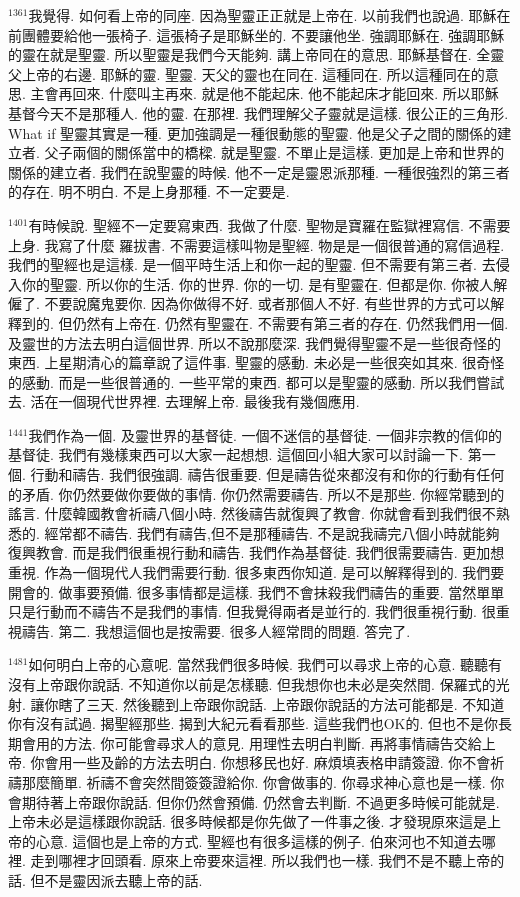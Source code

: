 \documentclass{book}
\begin{document}
$^{1361}$我覺得.
如何看上帝的同座.
因為聖靈正正就是上帝在.
以前我們也說過.
耶穌在前團體要給他一張椅子.
這張椅子是耶穌坐的.
不要讓他坐.
強調耶穌在.
強調耶穌的靈在就是聖靈.
所以聖靈是我們今天能夠.
講上帝同在的意思.
耶穌基督在.
全靈父上帝的右邊.
耶穌的靈.
聖靈.
天父的靈也在同在.
這種同在.
所以這種同在的意思.
主會再回來.
什麼叫主再來.
就是他不能起床.
他不能起床才能回來.
所以耶穌基督今天不是那種人.
他的靈.
在那裡.
我們理解父子靈就是這樣.
很公正的三角形.
What if 聖靈其實是一種.
更加強調是一種很動態的聖靈.
他是父子之間的關係的建立者.
父子兩個的關係當中的橋樑.
就是聖靈.
不單止是這樣.
更加是上帝和世界的關係的建立者.
我們在說聖靈的時候.
他不一定是靈恩派那種.
一種很強烈的第三者的存在.
明不明白.
不是上身那種.
不一定要是.

$^{1401}$有時候說.
聖經不一定要寫東西.
我做了什麼.
聖物是寶羅在監獄裡寫信.
不需要上身.
我寫了什麼 羅拔書.
不需要這樣叫物是聖經.
物是是一個很普通的寫信過程.
我們的聖經也是這樣.
是一個平時生活上和你一起的聖靈.
但不需要有第三者.
去侵入你的聖靈.
所以你的生活.
你的世界.
你的一切.
是有聖靈在.
但都是你.
你被人解僱了.
不要說魔鬼要你.
因為你做得不好.
或者那個人不好.
有些世界的方式可以解釋到的.
但仍然有上帝在.
仍然有聖靈在.
不需要有第三者的存在.
仍然我們用一個.
及靈世的方法去明白這個世界.
所以不說那麼深.
我們覺得聖靈不是一些很奇怪的東西.
上星期清心的篇章說了這件事.
聖靈的感動.
未必是一些很突如其來.
很奇怪的感動.
而是一些很普通的.
一些平常的東西.
都可以是聖靈的感動.
所以我們嘗試去.
活在一個現代世界裡.
去理解上帝.
最後我有幾個應用.

$^{1441}$我們作為一個.
及靈世界的基督徒.
一個不迷信的基督徒.
一個非宗教的信仰的基督徒.
我們有幾樣東西可以大家一起想想.
這個回小組大家可以討論一下.
第一個.
行動和禱告.
我們很強調.
禱告很重要.
但是禱告從來都沒有和你的行動有任何的矛盾.
你仍然要做你要做的事情.
你仍然需要禱告.
所以不是那些.
你經常聽到的謠言.
什麼韓國教會祈禱八個小時.
然後禱告就復興了教會.
你就會看到我們很不熟悉的.
經常都不禱告.
我們有禱告,但不是那種禱告.
不是說我禱完八個小時就能夠復興教會.
而是我們很重視行動和禱告.
我們作為基督徒.
我們很需要禱告.
更加想重視.
作為一個現代人我們需要行動.
很多東西你知道.
是可以解釋得到的.
我們要開會的.
做事要預備.
很多事情都是這樣.
我們不會抹殺我們禱告的重要.
當然單單只是行動而不禱告不是我們的事情.
但我覺得兩者是並行的.
我們很重視行動.
很重視禱告.
第二.
我想這個也是按需要.
很多人經常問的問題.
答完了.

$^{1481}$如何明白上帝的心意呢.
當然我們很多時候.
我們可以尋求上帝的心意.
聽聽有沒有上帝跟你說話.
不知道你以前是怎樣聽.
但我想你也未必是突然間.
保羅式的光射.
讓你瞎了三天.
然後聽到上帝跟你說話.
上帝跟你說話的方法可能都是.
不知道你有沒有試過.
揭聖經那些.
揭到大紀元看看那些.
這些我們也OK的.
但也不是你長期會用的方法.
你可能會尋求人的意見.
用理性去明白判斷.
再將事情禱告交給上帝.
你會用一些及齡的方法去明白.
你想移民也好.
麻煩填表格申請簽證.
你不會祈禱那麼簡單.
祈禱不會突然間簽簽證給你.
你會做事的.
你尋求神心意也是一樣.
你會期待著上帝跟你說話.
但你仍然會預備.
仍然會去判斷.
不過更多時候可能就是.
上帝未必是這樣跟你說話.
很多時候都是你先做了一件事之後.
才發現原來這是上帝的心意.
這個也是上帝的方式.
聖經也有很多這樣的例子.
伯來河也不知道去哪裡.
走到哪裡才回頭看.
原來上帝要來這裡.
所以我們也一樣.
我們不是不聽上帝的話.
但不是靈因派去聽上帝的話.
\end{document}

